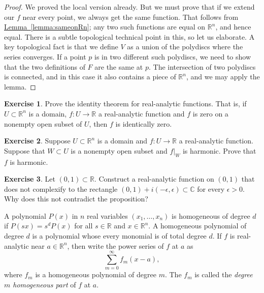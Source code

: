 \documentclass[12pt,openany]{book}
\newcommand{\C}{{\mathbb{C}}}
\newcommand{\R}{{\mathbb{R}}}
\newcommand{\myindex}[1]{#1\index{#1}}
\theoremstyle{plain}
\theoremstyle{remark}
\theoremstyle{definition}
\newenvironment{exbox}{%
    \def\FrameCommand{\vrule width 1pt \relax\hspace{10pt}}%
    \MakeFramed{\advance\hsize-\width\FrameRestore}%
}{%
    \endMakeFramed
}
\theoremstyle{exercise}
\newtheorem{exercise}{Exercise}[section]
\theoremstyle{example}
\newcommand{\lemmaref}[1]{\hyperref[#1]{Lemma~\ref*{#1}}}
\begin{document}
\begin{proof}
We proved the local version already.  But we must prove that if we
extend our $f$ near every point, we always get the same function.
That follows from \lemmaref{lemma:sameonRn}; any two such functions are
equal on $\R^n$, and hence equal.  There is a subtle topological technical
point in this, so let us elaborate.  A key topological fact is that we define
$V$ as a union of the polydiscs where the series converges.  If
a point $p$ is in two different such polydiscs, we need to show that
the two definitions of $F$ are the same at $p$.  The intersection
of two polydiscs is connected, and in this case it also contains a piece
of $\R^n$, and we may apply the lemma.
\end{proof}

\begin{exbox}
\begin{exercise}
Prove the identity theorem for real-analytic functions.  That is, if $U
\subset \R^n$ is a domain, $f \colon U \to \R$ a real-analytic function and
$f$ is zero on a nonempty open subset of $U$, then $f$ is identically zero.
\end{exercise}

\begin{exercise}
Suppose $U \subset \R^n$ is a domain and $f \colon U \to \R$ a real-analytic
function.  Suppose that $W \subset U$ is a nonempty open subset and
$f|_W$ is harmonic.  Prove that $f$ is harmonic.
\end{exercise}

\begin{exercise}
Let $(0,1) \subset \R$.  Construct a real-analytic function
on $(0,1)$ that does not complexify to the rectangle $(0,1) + i(-\epsilon,\epsilon)
\subset \C$ for every $\epsilon > 0$.  Why does this not contradict the
proposition?
\end{exercise}
\end{exbox}

A polynomial $P(x)$ in $n$ real variables $(x_1,\ldots,x_n)$ is homogeneous of degree $d$ if
$P(s x) = s^d P(x)$ for all $s \in \R$ and $x \in \R^n$.
A homogeneous polynomial of degree $d$ is a polynomial whose
every monomial
is of total degree $d$.
If $f$ is real-analytic near $a \in \R^n$, then
write the power series of $f$ at $a$ as
\begin{equation*}
\sum_{m=0}^{\infty} f_m(x-a) ,
\end{equation*}
where $f_m$ is a homogeneous polynomial of degree $m$.  The $f_m$ is
called the
\emph{\myindex{degree $m$ homogeneous part}} of $f$
at $a$.
\end{document}
